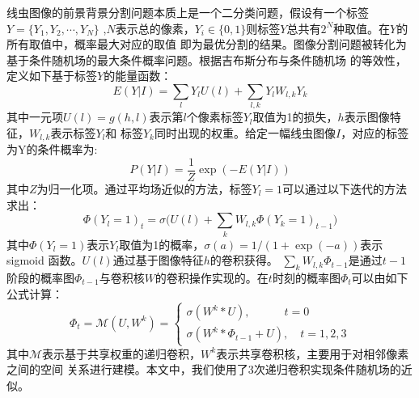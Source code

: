 	线虫图像的前景背景分割问题本质上是一个二分类问题，假设有一个标签$Y=\{Y_1,Y_2,\cdots,Y_N\}$
	,$N$表示总的像素，$Y_i\in\{0,1\}$则标签$Y$总共有$2^N$种取值。在$Y$的所有取值中，概率最大对应的取值
	即为最优分割的结果。图像分割问题被转化为基于条件随机场的最大条件概率问题。根据吉布斯分布与条件随机场
	的等效性\cite{Lafferty2001Conditional}，定义如下基于标签$Y$的能量函数：
	\begin{equation}
		E(Y|I) = \sum_{l}Y_lU(l)+\sum_{l,k}Y_lW_{l,k}Y_k
	\end{equation}
	其中一元项$U(l)=g(h,l)$表示第$l$个像素标签$Y_l$取值为1的损失，$h$表示图像特征，$W_{l,k}$表示标签$Y_l$和
	标签$Y_k$同时出现的权重。给定一幅线虫图像$I$，对应的标签为Y的条件概率为:
	\begin{equation}
		P(Y|I)=\frac{1}{Z}\exp(-E(Y|I))
	\end{equation}
	其中$Z$为归一化项。通过平均场近似\cite{zheng2015conditional}的方法，标签$Y_l=1$可以通过以下迭代的方法求出：
	\begin{equation}
		\Phi(Y_l=1)_t=\sigma\Big(U(l)+\sum_{k}W_{l,k}\Phi(Y_k=1)_{t-1}\Big)
	\end{equation}
	其中$\Phi(Y_l=1)$表示$Y_l$取值为1的概率，$\sigma(a)=1/(1+\exp(-a))$表示 sigmoid 函数。$U(l)$通过基于图像特征$h$的卷积获得。
	$\sum_{k}W_{l,k}\Phi_{t-1}$是通过$t-1$阶段的概率图$\Phi_{t-1}$与卷积核$W$的卷积操作实现的。在$t$时刻的概率图$\Phi_t$可以由如下公式计算：
	\begin{equation}
		\Phi_t=\mathscr{M}(U,W^k)=\begin{cases}
						\sigma(W^k*U), \quad \quad \quad t=0\\
						\sigma(W^k*\Phi_{t-1}+U), \quad t=1,2,3
						\end{cases}
	\end{equation}
	其中$\mathscr{M}$表示基于共享权重的递归卷积，$W^k$表示共享卷积核，主要用于对相邻像素之间的空间
	关系进行建模。本文中，我们使用了3次递归卷积实现条件随机场的近似。
	
	
